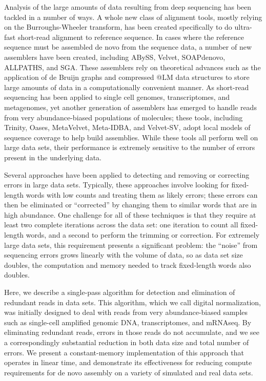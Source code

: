 \documentclass[10pt]{article}
\begin{document}
Analysis of the large amounts of data resulting from deep sequencing
has been tackled in a number of ways.  A whole new class of alignment
tools, mostly relying on the Burroughs-Wheeler transform, has been
created specifically to do ultra-fast short-read alignment to
reference sequence.  In cases where the reference sequence must be
assembled de novo from the sequence data, a number of new assemblers
have been created, including ABySS, Velvet, SOAPdenovo, ALLPATHS, and
SGA.  These assemblers rely on theoretical advances such as the
application of de Bruijn graphs and compressed @LM data structures to
store large amounts of data in a computationally convenient manner.
As short-read sequencing has been applied to single cell genomes,
transcriptomes, and metagenomes, yet another generation of assemblers
has emerged to handle reads from very abundance-biased populations of
molecules; these tools, including Trinity, Oases, MetaVelvet,
Meta-IDBA, and Velvet-SV, adopt local models of sequence coverage to
help build assemblies.  While these tools all perform well on large
data sets, their performance is extremely sensitive to the number of
errors present in the underlying data.

Several approaches have been applied to detecting and removing or
correcting errors in large data sets.  Typically, these approaches
involve looking for fixed-length words with low counts and treating
them as likely errors; these errors can then be eliminated or
``corrected'' by changing them to similar words that are in high
abundance.  One challenge for all of these techniques is that they
require at least two complete iterations across the data set: one
iteration to count all fixed-length words, and a second to perform the
trimming or correction.  For extremely large data sets, this
requirement presents a significant problem: the ``noise'' from
sequencing errors grows linearly with the volume of data, so as data
set size doubles, the computation and memory needed to track
fixed-length words also doubles.

Here, we describe a single-pass algorithm for detection and
elimination of redundant reads in data sets.  This algorithm, which we
call digital normalization, was initially designed to deal with reads
from very abundance-biased samples such as single-cell amplified
genomic DNA, transcriptomes, and mRNAseq.  By eliminating redundant
reads, errors in those reads do not accumulate, and we see a
correspondingly substantial reduction in both data size and total
number of errors.  We present a constant-memory implementation of this
approach that operates in linear time, and demonstrate its
effectiveness for reducing compute requirements for de novo assembly
on a variety of simulated and real data sets.
\end{document}
